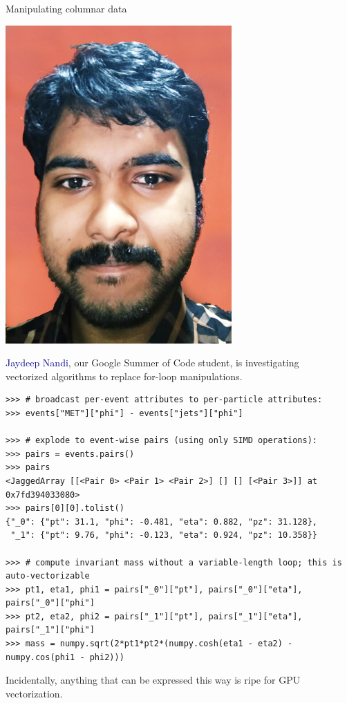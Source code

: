 \documentclass[aspectratio=169]{beamer}
\begin{document}
\begin{frame}[fragile]{Manipulating columnar data}
\vspace{0.3 cm}

\hfill \includegraphics[height=3 cm]{jaydeep.jpg}

\vspace{-3 cm}
\textcolor{darkblue}{Jaydeep Nandi}, our Google Summer of Code student, is investigating \\
vectorized algorithms to replace for-loop manipulations.

\vspace{0.1 cm}
\scriptsize
\begin{verbatim}
>>> # broadcast per-event attributes to per-particle attributes:
>>> events["MET"]["phi"] - events["jets"]["phi"]

>>> # explode to event-wise pairs (using only SIMD operations):
>>> pairs = events.pairs()
>>> pairs
<JaggedArray [[<Pair 0> <Pair 1> <Pair 2>] [] [] [<Pair 3>]] at 0x7fd394033080>
>>> pairs[0][0].tolist()
{"_0": {"pt": 31.1, "phi": -0.481, "eta": 0.882, "pz": 31.128},
 "_1": {"pt": 9.76, "phi": -0.123, "eta": 0.924, "pz": 10.358}}

>>> # compute invariant mass without a variable-length loop; this is auto-vectorizable
>>> pt1, eta1, phi1 = pairs["_0"]["pt"], pairs["_0"]["eta"], pairs["_0"]["phi"]
>>> pt2, eta2, phi2 = pairs["_1"]["pt"], pairs["_1"]["eta"], pairs["_1"]["phi"]
>>> mass = numpy.sqrt(2*pt1*pt2*(numpy.cosh(eta1 - eta2) - numpy.cos(phi1 - phi2)))
\end{verbatim}

\normalsize
\vspace{0.1 cm}
Incidentally, anything that can be expressed this way is ripe for GPU vectorization.
\end{frame}
\end{document}
